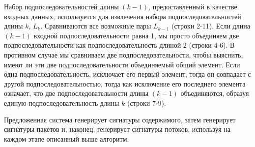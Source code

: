 Набор подпоследовательностей длины $(k-1)$, предоставленный в качестве входных данных, используется для извлечения набора подпоследовательностей длины $k$, $L_k$.
Сравниваются все возможные пары $L_{k-1}$ (строки 2-11).
Если длина $(k-1)$ входной подпоследовательности равна 1, мы просто объединяем две подпоследовательности как подпоследовательность длиной 2 (строки 4-6).
В противном случае мы сравниваем две подпоследовательности, чтобы выяснить, имеют ли эти две подпоследовательности объединяемый общий элемент.
Если одна подпоследовательность, исключает его первый элемент, тогда он совпадает с другой подпоследовательностью,
тогда как исключение его последнего элемента означает, что две подпоследовательности длины $(k-1)$ объединяются, образуя единую подпоследовательность длины $k$ (строки 7-9).

Предложенная система генерирует сигнатуры содержимого, затем генерирует сигнатуры пакетов и, наконец, генерирует сигнатуры потоков, используя на каждом этапе описанный выше алгоритм.


\newpage
